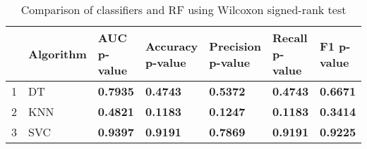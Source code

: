 \begin{table}
\footnotesize
\caption{Comparison of classifiers and RF using Wilcoxon signed-rank test}
\label{tab:wilcoxon comparison}
\begin{tabular}{lllllll}
\hline
 & Algorithm & AUC p-value & Accuracy p-value & Precision p-value & Recall p-value & F1 p-value \\
\hline
1 & DT & \textbf{0.7935} & \textbf{0.4743} & \textbf{0.5372} & \textbf{0.4743} & \textbf{0.6671} \\
2 & KNN & \textbf{0.4821} & \textbf{0.1183} & \textbf{0.1247} & \textbf{0.1183} & \textbf{0.3414} \\
3 & SVC & \textbf{0.9397} & \textbf{0.9191} & \textbf{0.7869} & \textbf{0.9191} & \textbf{0.9225} \\
\hline
\end{tabular}
\end{table}
